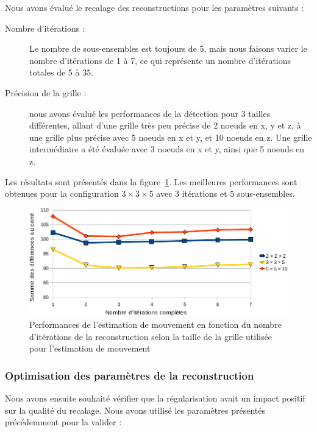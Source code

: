 Nous avons évalué le recalage des reconstructions pour les paramètres suivants :
\begin{description}
 \item[Nombre d'itérations :] Le nombre de sous-ensembles est toujours de 5, mais nous faisons varier le nombre d'itérations de 1 à 7, ce qui représente un nombre d'itérations totales de 5 à 35.
 \item[Précision de la grille :] nous avons évalué les performances de la détection pour 3 tailles différentes, allant d'une grille très peu précise de 2 noeuds en x, y et z, à une grille plus précise avec 5 noeuds en x et y, et 10 noeuds en z. Une grille intermédiaire a été évaluée avec 3 noeuds en x et y, ainsi que 5 noeuds en z.
\end{description}

Les résultats sont présentés dans la figure~\ref{fig:perfsFctIterTaille}. Les meilleures performances sont obtenues pour la configuration $3 \times 3 \times 5$ avec 3 itérations et 5 sous-ensembles.

\begin{figure}
\centering
\includegraphics[width=12cm]{images/perfsRecalageFctIter-grid_crop}
\caption[Performances de l'estimation de mouvement en fonction de la taille de la grille de recherche]{Performances de l'estimation de mouvement en fonction du nombre d'itérations de la reconstruction selon la taille de la grille utilisée pour l'estimation de mouvement}
\label{fig:perfsFctIterTaille}
\end{figure}

\subsubsection{Optimisation des paramètres de la reconstruction}

Nous avons ensuite souhaité vérifier que la régularisation avait un impact positif sur la qualité du recalage. Nous avons utilisé les paramètres présentés précédemment pour la valider :

